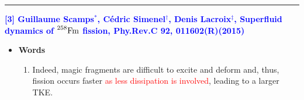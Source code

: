 \vspace{8pt}
\noindent\rule[0.25\baselineskip]{\textwidth}{2pt}
\noindent \textcolor{blue}{\textbf{[3] Guillaume Scamps${}^*$, C{\' e}dric Simenel${}^{\dag}$, Denis Lacroix${}^{\ddag}$, Superfluid dynamics of $\prescript{258}{}{\rm Fm}$ fission, Phy.Rev.C 92, 011602(R)(2015)}}
\begin{itemize}[leftmargin=10pt]
    \item \textbf{Words}
        \begin{enumerate}[leftmargin=10pt]
            \item Indeed, magic fragments are difficult to excite and deform and, thus, fission occurs faster \textcolor{red}{as less dissipation is involved}, leading to a larger TKE.
        \end{enumerate}
        
\end{itemize}

